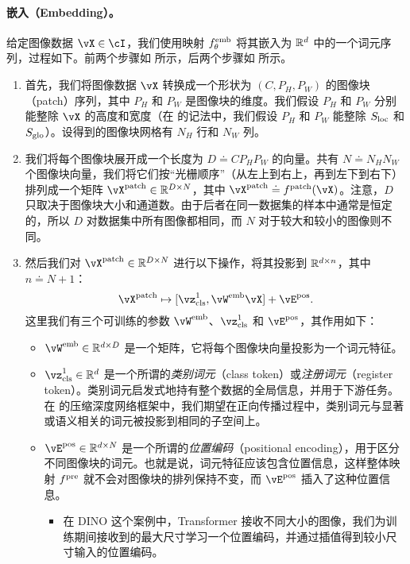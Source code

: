 \documentclass[../../book-main_zh.tex]{subfiles}
\begin{document}
\paragraph{嵌入（Embedding）。} 给定图像数据 \(\vX \in \cI\)，我们使用映射 \(f_{\theta}^{\mathrm{emb}}\) 将其嵌入为 \(\mathbb{R}^{d}\) 中的一个词元序列，过程如下。前两个步骤如  所示，后两个步骤如  所示。
\begin{enumerate}
    \item 首先，我们将图像数据 \(\vX\) 转换成一个形状为 \((C, P_{H}, P_{W})\) 的图像块（patch）序列，其中 \(P_{H}\) 和 \(P_{W}\) 是图像块的维度。我们假设 \(P_{H}\) 和 \(P_{W}\) 分别能整除 \(\vX\) 的高度和宽度（在  的记法中，我们假设 \(P_{H}\) 和 \(P_{W}\) 能整除 \(S_{\mathrm{loc}}\) 和 \(S_{\mathrm{glo}}\)）。设得到的图像块网格有 \(N_{H}\) 行和 \(N_{W}\) 列。
    \item 我们将每个图像块展开成一个长度为 \(D \doteq CP_{H}P_{W}\) 的向量。共有 \(N \doteq N_{H}N_{W}\) 个图像块向量，我们将它们按“光栅顺序”（从左上到右上，再到左下到右下）排列成一个矩阵 \(\vX^{\patch} \in \R^{D \times N}\)，其中 \(\vX^{\patch} \doteq f^{\patch}(\vX)\)。注意，\(D\) 只取决于图像块大小和通道数。由于后者在同一数据集的样本中通常是恒定的，所以 \(D\) 对数据集中所有图像都相同，而 \(N\) 对于较大和较小的图像则不同。
    \item 然后我们对 \(\vX^{\patch} \in \R^{D \times N}\) 进行以下操作，将其投影到 \(\mathbb{R}^{d \times n}\)，其中 \(n \doteq N + 1\)：
    \begin{equation}
        \vX^{\patch} \mapsto [\vz_{\cls}^{1}, \vW^{\emb}\vX] + \vE^{\pos}.
    \end{equation}
    这里我们有三个可训练的参数 \(\vW^{\emb}\)、\(\vz_{\cls}^{1}\) 和 \(\vE^{\pos}\)，其作用如下：
    \begin{itemize}
        \item \(\vW^{\emb} \in \R^{d \times D}\) 是一个矩阵，它将每个图像块向量投影为一个词元特征。
        \item \(\vz_{\cls}^{1} \in \R^{d}\) 是一个所谓的\textit{类别词元}（class token）或\textit{注册词元}（register token）。类别词元启发式地持有整个数据的全局信息，并用于下游任务。在  的压缩深度网络框架中，我们期望在正向传播过程中，类别词元与显著或语义相关的词元被投影到相同的子空间上。
        \item \(\vE^{\pos} \in \R^{d \times N}\) 是一个所谓的\textit{位置编码}（positional encoding），用于区分不同图像块的词元。也就是说，词元特征应该包含位置信息，这样整体映射 \(f^{\mathrm{pre}}\) 就不会对图像块的排列保持不变，而 \(\vE^{\pos}\) 插入了这种位置信息。
        \begin{itemize}
            \item 在 DINO 这个案例中，Transformer 接收不同大小的图像，我们为训练期间接收到的最大尺寸学习一个位置编码，并通过插值得到较小尺寸输入的位置编码。
        \end{itemize}
    \end{itemize}
\end{enumerate}
\end{document}
